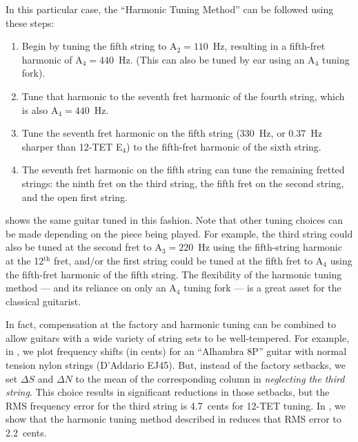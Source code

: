 In this particular case, the ``Harmonic Tuning Method'' can be followed using these steps:
 \begin{enumerate}
  \item Begin by tuning the fifth string to A$_2 = 110$~Hz, resulting in a fifth-fret harmonic of A$_4 = 440$~Hz. (This can also be tuned by ear using an A$_4$ tuning fork).
  \item Tune that harmonic to the seventh fret harmonic of the fourth string, which is also A$_4 = 440$~Hz.
  \item Tune the seventh fret harmonic on the fifth string (330~Hz, or 0.37~Hz sharper than 12-TET E$_4$) to the fifth-fret harmonic of the sixth string.
  \item The seventh fret harmonic on the fifth string can tune the remaining fretted strings: the ninth fret on the third string, the fifth fret on the second string, and the open first string.
 \end{enumerate}
 shows the same guitar tuned in this fashion. Note that other tuning choices can be made depending on the piece being played. For example, the third string could also be tuned at the second fret to A$_3 = 220$~Hz using the fifth-string harmonic at the 12$^\text{th}$ fret, and/or the first string could be tuned at the fifth fret to A$_4$ using the fifth-fret harmonic of the fifth string. The flexibility of the harmonic tuning method --- and its reliance on only an A$_4$ tuning fork --- is a great asset for the classical guitarist.

In fact, compensation at the factory and harmonic tuning can be combined to allow guitars with a wide variety of string sets to be well-tempered. For example, in , we plot frequency shifts (in cents) for an ``Alhambra 8P'' guitar with normal tension nylon strings (D'Addario EJ45). But, instead of the factory setbacks, we set $\Delta S$ and $\Delta N$ to the mean of the corresponding column in  \emph{neglecting the third string}. This choice results in significant reductions in those setbacks, but the RMS frequency error for the third string is 4.7~cents for 12-TET tuning. In , we show that the harmonic tuning method described in  reduces that RMS error to 2.2~cents.

